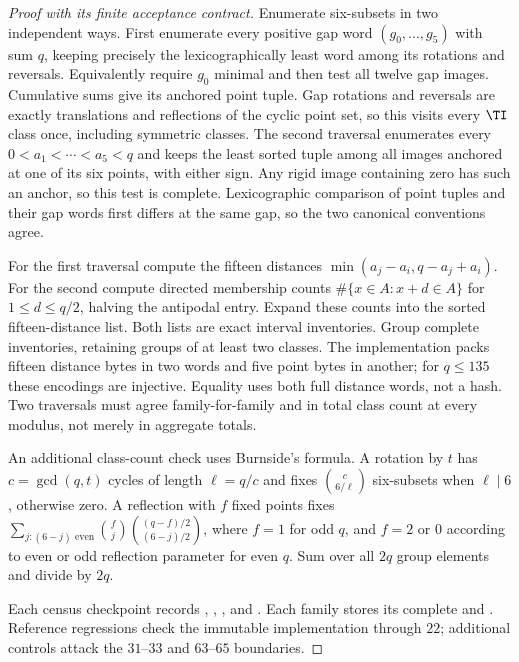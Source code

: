 \begin{proof}[Proof with its finite acceptance contract]
Enumerate six-subsets in two independent ways. First enumerate every
positive gap word $(g_0,\ldots,g_5)$ with sum $q$, keeping precisely the
lexicographically least word among its rotations and reversals. Equivalently
require $g_0$ minimal and then test all twelve gap images. Cumulative sums
give its anchored point tuple. Gap rotations and reversals are exactly
translations and reflections of the cyclic point set, so this visits every
$\TI$ class once, including symmetric classes. The second traversal
enumerates every $0<a_1<\cdots<a_5<q$ and keeps the least sorted tuple
among all images anchored at one of its six points, with either sign.
Any rigid image containing zero has such an anchor, so this test is complete.
Lexicographic comparison of point tuples and their gap words first differs
at the same gap, so the two canonical conventions agree.

For the first traversal compute the fifteen distances
$\min(a_j-a_i,q-a_j+a_i)$. For the second compute directed membership
counts $\#\{x\in A:x+d\in A\}$ for $1\le d\le q/2$, halving the
antipodal entry. Expand these counts into the sorted fifteen-distance list.
Both lists are exact interval inventories. Group complete inventories,
retaining groups of at least two classes. The implementation packs fifteen
distance bytes in two words and five point bytes in another; for
$q\le135$ these encodings are injective. Equality uses both full distance
words, not a hash. Two traversals must agree family-for-family and in
total class count at every modulus, not merely in aggregate totals.

An additional class-count check uses Burnside's formula. A rotation by
$t$ has $c=\gcd(q,t)$ cycles of length $\ell=q/c$ and fixes
$\binom{c}{6/\ell}$ six-subsets when $\ell\mid6$, otherwise zero.
A reflection with $f$ fixed points fixes
$\sum_{j:(6-j)\text{ even}}\binom f j
\binom{(q-f)/2}{(6-j)/2}$, where $f=1$ for odd $q$, and $f=2$ or
$0$ according to even or odd reflection parameter for even $q$.
Sum over all $2q$ group elements and divide by $2q$.

Each census checkpoint records , ,
,  and .
Each family stores its complete  and .
Reference regressions check the immutable implementation through $22$;
additional controls attack the $31$--$33$ and $63$--$65$ boundaries.


\end{proof}
